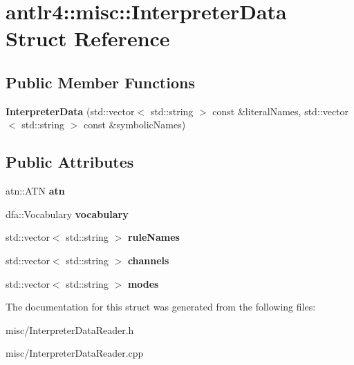\hypertarget{structantlr4_1_1misc_1_1InterpreterData}{}\section{antlr4\+:\+:misc\+:\+:Interpreter\+Data Struct Reference}
\label{structantlr4_1_1misc_1_1InterpreterData}
\subsection*{Public Member Functions}
\begin{DoxyCompactItemize}
\item 
\mbox{\label{structantlr4_1_1misc_1_1InterpreterData_abe6eb5fe6365256e15cc018589f6e651}} 
{\bfseries Interpreter\+Data} (std\+::vector$<$ std\+::string $>$ const \&literal\+Names, std\+::vector$<$ std\+::string $>$ const \&symbolic\+Names)
\end{DoxyCompactItemize}
\subsection*{Public Attributes}
\begin{DoxyCompactItemize}
\item 
\mbox{\label{structantlr4_1_1misc_1_1InterpreterData_aaee5599370ff7cb91974cfa4323e893e}} 
atn\+::\+A\+TN {\bfseries atn}
\item 
\mbox{\label{structantlr4_1_1misc_1_1InterpreterData_a92d27aea534934330d8c64d7960b87ea}} 
dfa\+::\+Vocabulary {\bfseries vocabulary}
\item 
\mbox{\label{structantlr4_1_1misc_1_1InterpreterData_a797c888869d58f6907892c804debebb2}} 
std\+::vector$<$ std\+::string $>$ {\bfseries rule\+Names}
\item 
\mbox{\label{structantlr4_1_1misc_1_1InterpreterData_a47b6bbaa21b355746c899e6ab40f3c92}} 
std\+::vector$<$ std\+::string $>$ {\bfseries channels}
\item 
\mbox{\label{structantlr4_1_1misc_1_1InterpreterData_a5953b747dc020f758b5fba4771c195b8}} 
std\+::vector$<$ std\+::string $>$ {\bfseries modes}
\end{DoxyCompactItemize}


The documentation for this struct was generated from the following files\+:\begin{DoxyCompactItemize}
\item 
misc/Interpreter\+Data\+Reader.\+h\item 
misc/Interpreter\+Data\+Reader.\+cpp\end{DoxyCompactItemize}
